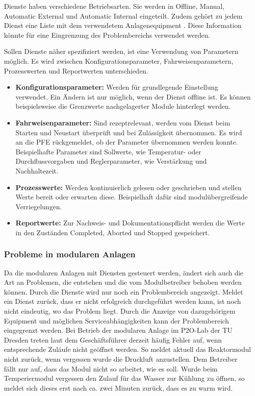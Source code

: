 Dienste haben verschiedene Betriebsarten. Sie werden in Offline, Manual, Automatic External und Automatic Internal eingeteilt. Zudem gehört zu jedem Dienst eine Liste mit dem verwendetem Anlagenequipment \cite{VDI2658-Blatt4}. Diese Information könnte für eine Eingrenzung des Problembereichs verwendet werden.

Sollen Dienste näher spezifiziert werden, ist eine Verwendung von Parametern möglich. Es wird zwischen Konfigurationsparameter, Fahrweisenparametern, Prozesswerten und Reportwerten unterschieden. \cite{VDI2658-Blatt4}
\begin{itemize}
\item \textbf{Konfigurationsparameter:} Werden für grundlegende Einstellung verwendet. Ein Ändern ist nur möglich, wenn der Dienst offline ist. Es können beispielsweise die Grenzwerte nachgelagerter Module hinterlegt werden.
\item \textbf{Fahrweisenparameter:} Sind rezeptrelevant, werden vom Dienst beim Starten und Neustart überprüft und bei Zulässigkeit übernommen. Es wird an die PFE rückgemeldet, ob der Parameter übernommen werden konnte. Beispielhafte Parameter sind Sollwerte, wie Temperatur- oder Durchflussvorgaben und Reglerparameter, wie Verstärkung und Nachhaltezeit.
\item \textbf{Prozesswerte:} Werden kontinuierlich gelesen oder geschrieben und stellen Werte bereit oder erwarten diese. Beispielhaft dafür sind modulübergreifende Verriegelungen.
\item \textbf{Reportwerte:} Zur Nachweis- und Dokumentationspflicht werden die Werte in den Zuständen Completed, Aborted und Stopped gespeichert.
\end{itemize}

\subsubsection*{Probleme in modularen Anlagen}
\label{Probleme-modulare-Anlage}
Da die modularen Anlagen mit Diensten gesteuert werden, ändert sich auch die Art an Problemen, die entstehen und die vom Modulbetreiber behoben werden können. Durch die Dienste wird nur noch ein Problembereich angezeigt. Meldet ein Dienst zurück, dass er nicht erfolgreich durchgeführt werden kann, ist noch nicht eindeutig, wo das Problem liegt. Durch die Anzeige von dazugehörigem Equipment und möglichen Serviceabhängigkeiten kann der Problembereich eingegrenzt werden. Bei Betrieb der modularen Anlage im P2O-Lab der TU Dresden treten laut dem Geschäftsführer derzeit häufig Fehler auf, wenn entsprechende Zuläufe nicht geöffnet werden. So meldet aktuell das Reaktormodul nicht zurück, wenn vergessen wurde die Druckluft anzustellen. Dem Betreiber fällt nur auf, dass das Modul nicht so arbeitet, wie es soll. Wurde beim Temperiermodul vergessen den Zulauf für das Wasser zur Kühlung zu öffnen, so meldet sich dieses erst nach ca. zwei Minuten zurück, dass es zu warm wird.

